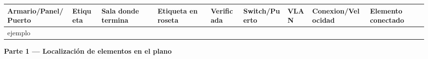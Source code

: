 \documentclass[
  spanish,
  11pt,
  paper=a4,
  ,captions=tableheading
]{scrartcl}
\newcounter{none} %
\begin{document}
{\def\LTcaptype{none} %
\begin{longtable}[]{@{}
  >{\raggedright\arraybackslash}p{}
  >{\raggedright\arraybackslash}p{}
  >{\raggedright\arraybackslash}p{}
  >{\raggedright\arraybackslash}p{}
  >{\raggedright\arraybackslash}p{}
  >{\raggedright\arraybackslash}p{}
  >{\raggedright\arraybackslash}p{}
  >{\raggedright\arraybackslash}p{}
  >{\raggedright\arraybackslash}p{}@{}}
\toprule\noalign{}
\begin{minipage}[b]{\linewidth}\raggedright
Armario/Panel/Puerto
\end{minipage} & \begin{minipage}[b]{\linewidth}\raggedright
Etiqueta
\end{minipage} & \begin{minipage}[b]{\linewidth}\raggedright
Sala donde termina
\end{minipage} & \begin{minipage}[b]{\linewidth}\raggedright
Etiqueta en roseta
\end{minipage} & \begin{minipage}[b]{\linewidth}\raggedright
Verificada
\end{minipage} & \begin{minipage}[b]{\linewidth}\raggedright
Switch/Puerto
\end{minipage} & \begin{minipage}[b]{\linewidth}\raggedright
VLAN
\end{minipage} & \begin{minipage}[b]{\linewidth}\raggedright
Conexion/Velocidad
\end{minipage} & \begin{minipage}[b]{\linewidth}\raggedright
Elemento conectado
\end{minipage} \\
\midrule\noalign{}
\endhead
\bottomrule\noalign{}
\endlastfoot
ejemplo & & & & & & & & \\
\end{longtable}
}

\normalsize

\textbf{Parte 1 --- Localización de elementos en el plano}
\end{document}
